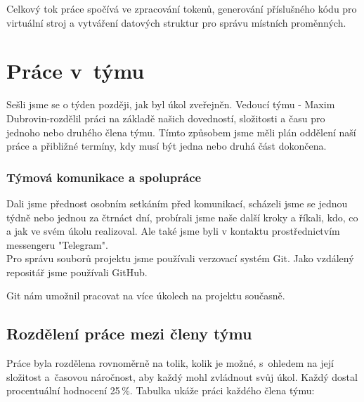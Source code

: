 \documentclass[a4paper, 11pt]{article}
\begin{document}
        
        Celkový tok práce spočívá ve zpracování tokenů, generování příslušného kódu pro virtuální stroj a vytváření datových struktur pro správu místních proměnných.


	\section{Práce v~týmu}

        Sešli jsme se o týden později, jak byl úkol zveřejněn. Vedoucí týmu - Maxim Dubrovin-rozdělil práci na základě našich dovedností, složitosti a času pro jednoho nebo druhého člena týmu. Tímto způsobem jsme měli plán oddělení naší práce a přibližné termíny, kdy musí být jedna nebo druhá část dokončena.

	\subsubsection{Týmová komunikace a spolupráce}

        Dali jsme přednost osobním setkáním před komunikací, scházeli jsme se jednou týdně nebo jednou za čtrnáct dní, probírali jsme naše další kroky a říkali, kdo, co a jak ve svém úkolu realizoval. Ale také jsme byli v kontaktu prostřednictvím messengeru "Telegram".
        \\
        
	Pro správu souborů projektu jsme používali verzovací systém Git. Jako vzdálený repositář jsme používali \mbox{GitHub}.

	Git nám umožnil pracovat na více úkolech na projektu současně.

	\subsection{Rozdělení práce mezi členy týmu}

        Práce byla rozdělena rovnoměrně na tolik, kolik je možné, s~ohledem na její složitost a~časovou náročnost, aby každý mohl zvládnout svůj úkol.
	Každý dostal procentuální hodnocení 25\,\%.
	Tabulka ukáže práci každého člena týmu:
        \\
        
\end{document}

